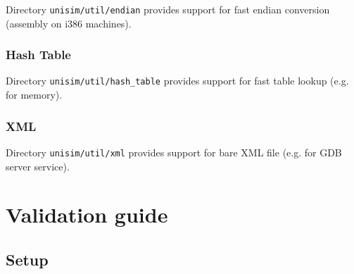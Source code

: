 Directory \texttt{unisim/util/endian} provides support for fast endian conversion (assembly on i386 machines).

\subsubsection{Hash Table}

Directory \texttt{unisim/util/hash\_table} provides support for fast table lookup (e.g. for memory).

\subsubsection{XML}

Directory \texttt{unisim/util/xml} provides support for bare XML file (e.g. for GDB server service).

\newpage
\section{Validation guide}

\subsection{Setup}

